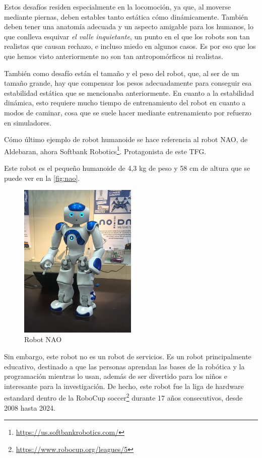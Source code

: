 Estos desafíos residen especialmente en la locomoción, ya que, al moverse mediante piernas, deben estables tanto estática cómo dinámicamente. También deben tener una anatomía adecuada y un aspecto amigable para los humanos, lo que conlleva esquivar \textit{el valle inquietante}, un punto en el que los robots son tan realistas que causan rechazo, e incluso miedo en algunos casos. Es por eso que los que hemos visto anteriormente no son tan antropomórficos ni realistas. 

También como desafío están el tamaño y el peso del robot, que, al ser de un tamaño grande, hay que compensar los pesos adecuadamente para conseguir esa estabilidad estática que se mencionaba anteriormente. En cuanto a la estabilidad dinámica, esto requiere mucho tiempo de entrenamiento del robot en cuanto a modos de caminar, cosa que se suele hacer mediante entrenamiento por refuerzo en simuladores.

Cómo último ejemplo de robot humanoide se hace referencia al robot NAO\cite{pagina_nao}, de Aldebaran, ahora Softbank Robotics\footnote{\url{https://us.softbankrobotics.com/}}. Protagonista de este TFG.

Este robot es el pequeño humanoide de 4,3 kg de peso y 58 cm de altura que se puede ver en la \autoref{fig:nao}.

\begin{figure}[H]
    \centering
    \includegraphics[width=0.5\textwidth]{figures/cap_1/nao.jpg}
    \caption{Robot NAO}
    \label{fig:nao}
\end{figure}

Sin embargo, este robot no es un robot de servicios. Es un robot principalmente educativo, destinado a que las personas aprendan las bases de la robótica y la programación mientras lo usan, además de ser divertido para los niños e interesante para la investigación. De hecho, este robot fue la liga de hardware estandard dentro de la RoboCup soccer\footnote{\url{https://www.robocup.org/leagues/5}} durante 17 años consecutivos, desde 2008 hasta 2024.

